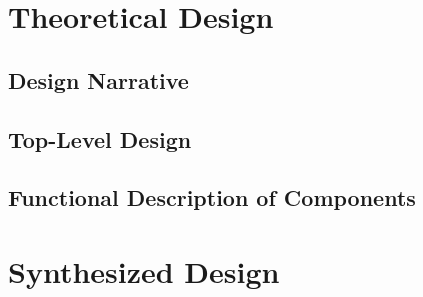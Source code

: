 \section{Theoretical Design}
\label{sec:Theoretical Design}

\subsection{Design Narrative}
\label{sub:Design Narrative}

\subsection{Top-Level Design}
\label{sub:Top-Level Design}

\subsection{Functional Description of Components}
\label{sub:Functional Description of Components}

\section{Synthesized Design}
\label{sec:Synthesized Design}
